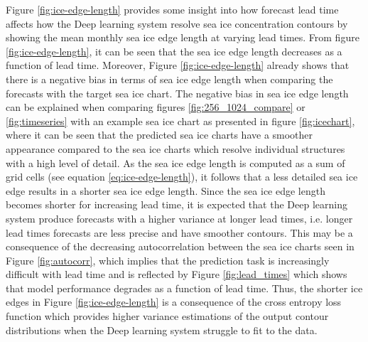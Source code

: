 \documentclass[../main/thesis]{subfiles}
\begin{document}
Figure \ref{fig:ice-edge-length} provides some insight into how forecast lead time affects how the Deep learning system resolve sea ice concentration contours by showing the mean monthly sea ice edge length at varying lead times. From figure \ref{fig:ice-edge-length}, it can be seen that the sea ice edge length decreases as a function of lead time. Moreover, Figure \ref{fig:ice-edge-length} already shows that there is a negative bias in terms of sea ice edge length when comparing the forecasts with the target sea ice chart. The negative bias in sea ice edge length can be explained when comparing figures \ref{fig:256_1024_compare} or \ref{fig:timeseries} with an example sea ice chart as presented in figure \ref{fig:icechart}, where it can be seen that the predicted sea ice charts have a smoother appearance compared to the sea ice charts which resolve individual structures with a high level of detail. As the sea ice edge length is computed as a sum of grid cells (see equation \ref{eq:ice-edge-length}), it follows that a less detailed sea ice edge results in a shorter sea ice edge length. Since the sea ice edge length becomes shorter for increasing lead time, it is expected that the Deep learning system produce forecasts with a higher variance at longer lead times, i.e. longer lead times forecasts are less precise and have smoother contours. This may be a consequence of the decreasing autocorrelation between the sea ice charts seen in Figure \ref{fig:autocorr}, which implies that the prediction task is increasingly difficult with lead time and is reflected by Figure \ref{fig:lead_times} which shows that model performance degrades as a function of lead time. Thus, the shorter ice edges in Figure \ref{fig:ice-edge-length} is a consequence of the cross entropy loss function which provides higher variance estimations of the output contour distributions when the Deep learning system struggle to fit to the data.
\end{document}
